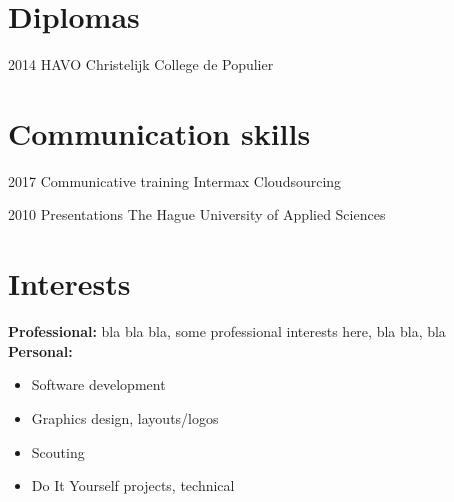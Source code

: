 \documentclass[]{friggeri-cv}
\providecommand{\tightlist}{%
\setlength{\itemsep}{0pt}\setlength{\parskip}{0pt}}
\begin{document}
\section{Diplomas}

\begin{entrylist}


\entry
{2014}
{HAVO}
{Christelijk College de Populier}


\end{entrylist}


\section{Communication skills}

\begin{entrylist}


\entry
{2017}
{Communicative training}
{Intermax Cloudsourcing}


\entry
{2010}
{Presentations}
{The Hague University of Applied Sciences}


\end{entrylist}


\section{Interests}

\textbf{Professional:} bla bla bla, some professional interests here, bla bla,
bla\\

\textbf{Personal:}
\begin{multicols}{2}
\begin{itemize}
  \tightlist{}
  \item Software development
  \item Graphics design, layouts/logos
  \item Scouting
  \item Do It Yourself projects, technical
\end{itemize}
\end{multicols}

\end{document}
